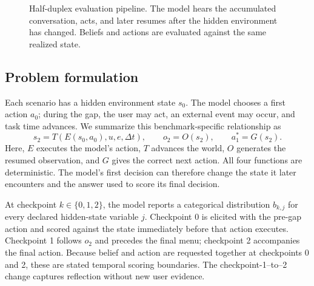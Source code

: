 \documentclass{article}
\begin{document}
\begin{figure}[t]
  \caption{Half-duplex evaluation pipeline. The model hears the accumulated conversation, acts, and later resumes after the hidden environment has changed. Beliefs and actions are evaluated against the same realized state.}
  \label{fig:pipeline}
\end{figure}

\subsection{Problem formulation}

Each scenario has a hidden environment state $s_0$. The model chooses a first action $a_0$; during the gap, the user may act, an external event may occur, and task time advances. We summarize this benchmark-specific relationship as
\begin{equation}
  s_2=T(E(s_0,a_0),u,e,\Delta t), \qquad o_2=O(s_2), \qquad a_1^*=G(s_2).
\end{equation}
Here, $E$ executes the model's action, $T$ advances the world, $O$ generates the resumed observation, and $G$ gives the correct next action. All four functions are deterministic. The model's first decision can therefore change the state it later encounters and the answer used to score its final decision.

At checkpoint $k\in\{0,1,2\}$, the model reports a categorical distribution $b_{k,j}$ for every declared hidden-state variable $j$. Checkpoint 0 is elicited with the pre-gap action and scored against the state immediately before that action executes. Checkpoint 1 follows $o_2$ and precedes the final menu; checkpoint 2 accompanies the final action. Because belief and action are requested together at checkpoints 0 and 2, these are stated temporal scoring boundaries. The checkpoint-1--to--2 change captures reflection without new user evidence.
\end{document}
